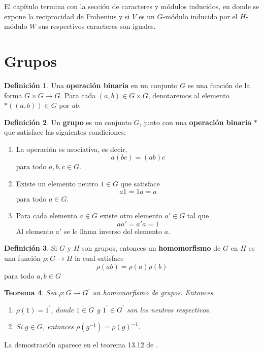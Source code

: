 \documentclass[12pt]{book}
\newtheorem{theorem}{Teorema}[section]
\theoremstyle{definition}
\newtheorem{definition}[theorem]{Definición}
\newcounter{in}
\newcounter{ini}
\begin{document}
El capítulo termina con la sección de caracteres y módulos inducidos,
en donde se expone la reciprocidad de Frobenius y si $V$ es un
$G$-módulo inducido por el $H$-módulo $W$ sus respectivos caracteres
son iguales.

\section{Grupos}
\label{grupos}

\begin{definition}
  Una \textbf{operación binaria} en un conjunto $G$ es una función
  de la forma $G  \times G \rightarrow G$. Para cada $(a,b)\in G
  \times G$, denotaremos al elemento $*((a,b))\in G$ por $ab$. 
\end{definition} 

\begin{definition} 
  Un \textbf{grupo} es un conjunto $G$, junto con una
  \textbf{operación binaria} $*$ que satisface las siguientes condiciones:
    \begin{enumerate}
    \item La operación es asociativa, es decir, $$a(bc)=(ab)c$$ para todo $a,b,c \in G$.
    \item Existe un elemento neutro $1 \in G$ que
      satisface $$a1=1a=a$$ para todo $a \in G$.
    \item Para cada elemento $a \in G$ existe otro elemento $a' \in G$
      tal que $$aa'=a'a=1$$ Al elemento $a'$ se le llama inverso del elemento $a$.
    \end{enumerate}
\end{definition}

\begin{definition}
  Si $G$ y $H$ son grupos, entonces un \textbf{homomorfismo} de $G$
  en $H$ es una función $\rho:G\rightarrow H$ la cual
  satisface $$\rho(ab)=\rho(a)\rho(b)$$ para todo $a,b \in G$
\end{definition}

\begin{theorem}
  Sea $\rho:G\rightarrow G^{'}$ un homomorfismo de grupos. Entonces
  \begin{enumerate}
    \item $\rho(1)=1^{'}$, donde $1\in G$ y  $1^{'}\in G^{'}$ son los
    neutros respectivos. 
    \item Si $g\in G$, entonces $\rho(g^{-1})=\rho (g)^{-1}$.
  \end{enumerate}
\end{theorem}
La demostración aparece en el teorema 13.12 de \cite{fraleigh}.
\end{document}
